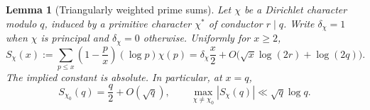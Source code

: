 \documentclass[11pt,a4paper]{article}
\newtheorem{lemma}[theorem]{Lemma}
\theoremstyle{definition}
\theoremstyle{remark}
\begin{document}
\begin{lemma}[Triangularly weighted prime sums]\label{p-lem:eos-smoothed}
Let $\chi$ be a Dirichlet character modulo $q$, induced by a primitive
character $\chi^*$ of conductor $r\mid q$. Write $\delta_\chi=1$ when
$\chi$ is principal and $\delta_\chi=0$ otherwise. Uniformly for $x\geq2$,
\begin{equation}\label{p-eq:eos-smoothed}
 S_\chi(x):=\sum_{p\leq x}\left(1-\frac px\right)(\log p)\chi(p)
 =\delta_\chi\frac x2
  +O\bigl(\sqrt{x}\log(2r)+\log(2q)\bigr).
\end{equation}
The implied constant is absolute. In particular, at $x=q$,
\begin{equation}\label{p-eq:eos-at-q}
 S_{\chi_0}(q)=\frac q2+O(\sqrt q),
 \qquad
 \max_{\chi\ne\chi_0}|S_\chi(q)|\ll\sqrt q\log q.
\end{equation}
\end{lemma}
\end{document}

